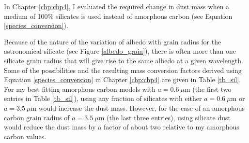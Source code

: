 In Chapter \ref{chp:chp4}, I evaluated the required change in dust mass when a medium of 100\% 
silicates is used instead of amorphous carbon (see Equation \ref{species_conversion}). 
%

Because of the nature of the variation of albedo with grain radius for the 
\citet{Draine1984} astronomical silicate (see Figure \ref{albedo_grain}), 
there is often more than one silicate grain radius that will give rise to 
the same albedo at a given wavelength.  Some of the possibilities and the 
resulting mass conversion factors derived using Equation \ref{species_conversion} in Chapter \ref{chp:chp4} are given in Table \ref{tb_sil}.  For 
my best fitting amorphous carbon models with $a=0.6~\mu$m (the first two 
entries in Table \ref{tb_sil}), using any fraction of silicates with 
either $a=0.6~\mu$m or $a=3.5~\mu$m would increase the dust mass.  
However, 
for the case of an amorphous carbon grain radius of $a=3.5~\mu$m (the last 
three entries), using silicate dust would reduce the dust mass by a factor 
of about two relative to my amorphous carbon values.

